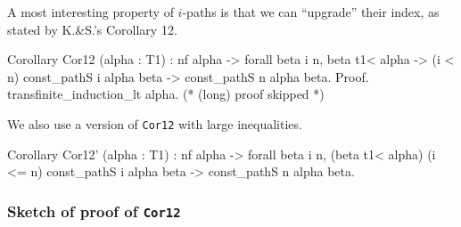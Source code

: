 \documentclass[a4paper]{book}
\begin{document}











A most interesting property of $i$-paths is that we can ``upgrade'' their index, as stated by K.\&S.'s Corollary 12.


\begin{Coqsrc}
Corollary Cor12 (alpha : T1) :  nf alpha ->
         forall beta i n, beta  t1< alpha  ->
                (i < n)%
                 const_pathS i alpha beta ->
                 const_pathS n alpha beta.
Proof.
  transfinite_induction_lt alpha.
  (* (long) proof skipped *)
\end{Coqsrc}

We  also use a version of \texttt{Cor12} with large inequalities.


\begin{Coqsrc}
Corollary Cor12' (alpha : T1) :  nf alpha ->
         forall beta i n, (beta t1< alpha)%
               (i <= n)%
               const_pathS i alpha beta ->
               const_pathS n alpha beta.
\end{Coqsrc}


\subsubsection{Sketch of proof of \texttt{Cor12}}
\end{document}
